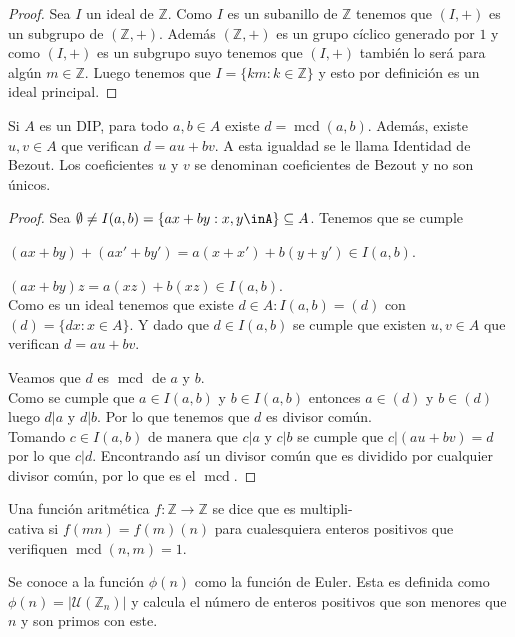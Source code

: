 \begin{proof}
		Sea $I$ un ideal de $\mathbb{Z}$. Como $I$ es un subanillo de $\mathbb{Z}$ tenemos que $(I,+)$ es un subgrupo de $(\mathbb{Z}, +)$. Además $(\mathbb{Z}, +)$ es un grupo cíclico generado por $1$ y como $(I,+)$ es un subgrupo suyo tenemos que $(I,+)$ también lo será para algún $m \in \mathbb{Z}$. Luego tenemos que $I=\{km:k\in\mathbb{Z}\}$ y esto por definición es un ideal principal.
\end{proof}
\begin{teorema}
		Si $A$ es un DIP, para todo $a,b\in A$ existe $d = \operatorname{mcd}(a,b)$. Además, existe $u,v \in A$ que verifican $d=au+bv$. A esta igualdad se le llama Identidad de Bezout. Los coeficientes $u$ y $v$ se denominan coeficientes de Bezout y no son únicos.
\end{teorema}
\begin{proof}
	Sea $\emptyset \neq I(a,b)=\{ax+by:x,y\inA\}\subseteq A$. Tenemos que se cumple\par
	 $(ax+by)+(ax'+by')=a(x+x')+b(y+y')\in I(a,b)$.\par
	 $(ax+by)z=a(xz)+b(xz)\in I(a,b)$.\\
	 Como es un ideal tenemos que existe $ d \in A:I(a,b)=(d)$ con $(d)=\{dx:x\in A\}$. Y dado que $d\in I(a,b)$ se cumple que existen $ u,v \in A$ que verifican $d=au+bv$.\par
	 Veamos que $d$ es $\operatorname{mcd}$ de $a$ y $b$.\\ Como se cumple que $a\in I(a,b)$ y $b\in I(a,b)$ entonces $a\in (d)$ y $b\in (d)$ luego $d|a$ y $d|b$. Por lo que tenemos que $d$ es divisor común.\\
	 Tomando $c\in I(a,b)$ de manera que $c|a$ y $c|b$ se cumple que $c|(au+bv)=d$ por lo que $c|d$. Encontrando así un divisor común que es dividido por cualquier divisor común, por lo que es el $\operatorname{mcd}$.
\end{proof}
\begin{definicion}
		Una función aritmética $f:\mathbb{Z}\rightarrow \mathbb{Z}$ se dice que es multipli-\\cativa si $f(mn)=f(m)(n)$ para cualesquiera enteros positivos que verifiquen $\operatorname{mcd}(n,m)=1$.
\end{definicion}
\begin{definicion}
		Se conoce a la función $\phi(n)$ como la función de Euler. Esta es definida como $\phi(n)=|\mathcal{U}(\mathbb{Z}_n)|$ y calcula el número de enteros positivos que son menores que $n$ y son primos con este. 
\end{definicion}
